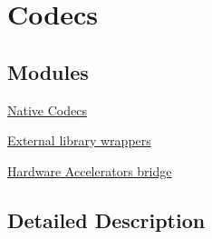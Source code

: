 \hypertarget{group__lavc__codec}{}\section{Codecs}
\label{group__lavc__codec}
\subsection*{Modules}
\begin{DoxyCompactItemize}
\item 
\hyperlink{group__lavc__codec__native}{Native Codecs}
\item 
\hyperlink{group__lavc__codec__wrappers}{External library wrappers}
\item 
\hyperlink{group__lavc__codec__hwaccel}{Hardware Accelerators bridge}
\end{DoxyCompactItemize}


\subsection{Detailed Description}

